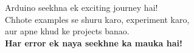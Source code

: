 \documentclass[12pt,a4paper]{article}
\begin{document}
\vspace{1cm}

\begin{tcolorbox}[colback=arduinoBlue!10, colframe=arduinoBlue, title=\textbf{All the Best!}]
\centering
\large\sffamily
Arduino seekhna ek exciting journey hai!\\
Chhote examples se shuru karo, experiment karo,\\
aur apne khud ke projects banao.\\[0.3cm]
\textbf{Har error ek naya seekhne ka mauka hai!}
\end{tcolorbox}
\end{document}
